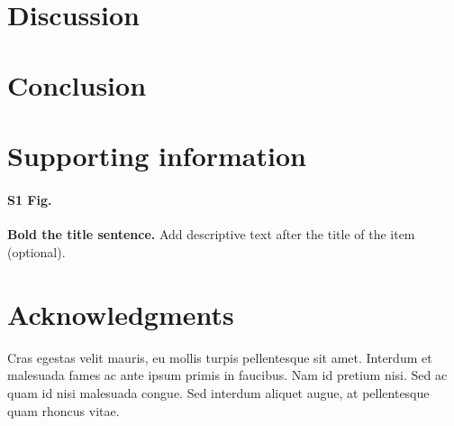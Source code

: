\documentclass[10pt,letterpaper]{article}
\begin{document}
\begin{eqnarray}\end{eqnarray}

\begin{verbatim}
\end{verbatim}

































\section*{Discussion}

\section*{Conclusion}


\section*{Supporting information}

\paragraph*{S1 Fig.}
\label{S1_Fig}
{\bf Bold the title sentence.} Add descriptive text after the title of the item (optional).

\section*{Acknowledgments}
Cras egestas velit mauris, eu mollis turpis pellentesque sit amet. Interdum et malesuada fames ac ante ipsum primis in faucibus. Nam id pretium nisi. Sed ac quam id nisi malesuada congue. Sed interdum aliquet augue, at pellentesque quam rhoncus vitae.
\end{document}
